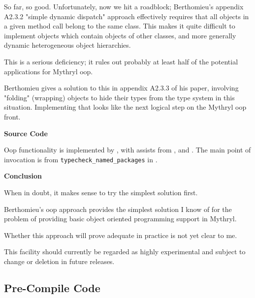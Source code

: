 So far, so good.  Unfortunately, now we hit a roadblock;  Berthomieu's appendix 
A2.3.2 "simple dynamic dispatch" approach effectively requires that all objects 
in a given method call belong to the same class.  This makes it quite difficult 
to implement objects which contain objects of other classes, and more generally 
dynamic heterogeneous object hierarchies.

This is a serious deficiency; it rules out probably at least 
half of the potential applications for Mythryl oop.

Berthomieu gives a solution to this in appendix A2.3.3 of his paper, involving 
"folding" (wrapping) objects to hide their types from the type system in this 
situation.  Implementing that looks like the next logical step on the Mythryl 
oop front.

{\bf Source Code}

Oop functionality is implemented by 
, 
with assists from  
, 
and 
.  The 
main point of invocation is from {\tt typecheck\_named\_packages} in 
.

{\bf Conclusion}

When in doubt, it makes sense to try the simplest solution first.

Berthomieu's oop approach provides the simplest solution I know of for the 
problem of providing basic object oriented programming support in Mythryl.

Whether this approach will prove adequate in practice is not yet clear to me.

This facility should currently be regarded as highly experimental and 
subject to change or deletion in future releases.

\cutend*


\subsection{Pre-Compile Code}
\label{section:tut:full-monte:pre-compile-code}

